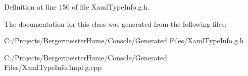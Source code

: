 Definition at line 150 of file Xaml\+Type\+Info.\+g.\+h.



The documentation for this class was generated from the following files\+:\begin{DoxyCompactItemize}
\item 
C\+:/\+Projects/\+Bergermeister\+Home/\+Console/\+Generated Files/Xaml\+Type\+Info.\+g.\+h\item 
C\+:/\+Projects/\+Bergermeister\+Home/\+Console/\+Generated Files/Xaml\+Type\+Info.\+Impl.\+g.\+cpp\end{DoxyCompactItemize}
